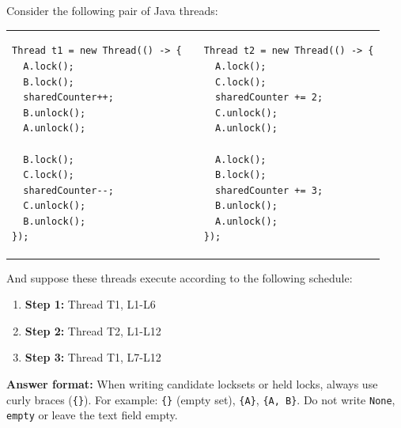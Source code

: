 \documentclass[addpoints]{exam}
\begin{document}
\begin{questions}

\newpage

\question Consider the following pair of Java threads:

  \begin{tabular}{p{.45\linewidth}|cp{.45\linewidth}}
  \begin{verbatim}
Thread t1 = new Thread(() -> {
  A.lock();
  B.lock();
  sharedCounter++;
  B.unlock();
  A.unlock();

  B.lock();
  C.lock();
  sharedCounter--;
  C.unlock();
  B.unlock();
});
\end{verbatim}
    &
\quad &
\begin{verbatim}
Thread t2 = new Thread(() -> {
  A.lock();
  C.lock();
  sharedCounter += 2;
  C.unlock();
  A.unlock();

  A.lock();
  B.lock();
  sharedCounter += 3;
  B.unlock();
  A.unlock();
});
\end{verbatim}
  \end{tabular}

  And suppose these threads execute according to the following schedule:
  \begin{enumerate}
  \item \textbf{Step 1:} Thread T1, L1-L6
  \item \textbf{Step 2:} Thread T2, L1-L12
  \item \textbf{Step 3:} Thread T1, L7-L12
  \end{enumerate}
\textbf{Answer format:} When writing candidate locksets or held locks, always use curly braces
(\texttt{\{\}}).
For example: \texttt{\{\}} (empty set), \texttt{\{A\}}, \texttt{\{A, B\}}. Do not write \texttt{None}, \texttt{empty} or leave the text field empty.\\

\begin{parts}


\end{parts}
\end{questions}
\end{document}
